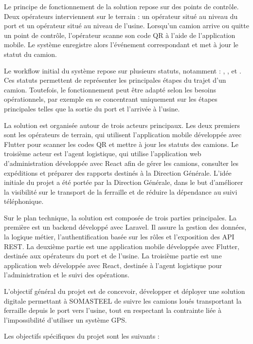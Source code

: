 Le principe de fonctionnement de la solution repose sur des points de contrôle. Deux opérateurs interviennent sur le terrain : un opérateur situé au niveau du port et un opérateur situé au niveau de l'usine. Lorsqu'un camion arrive ou quitte un point de contrôle, l'opérateur scanne son code QR à l'aide de l'application mobile. Le système enregistre alors l'événement correspondant et met à jour le statut du camion.

Le workflow initial du système repose sur plusieurs statuts, notamment : , ,  et . Ces statuts permettent de représenter les principales étapes du trajet d'un camion. Toutefois, le fonctionnement peut être adapté selon les besoins opérationnels, par exemple en se concentrant uniquement sur les étapes principales telles que la sortie du port et l'arrivée à l'usine.

La solution est organisée autour de trois acteurs principaux. Les deux premiers sont les opérateurs de terrain, qui utilisent l'application mobile développée avec Flutter pour scanner les codes QR et mettre à jour les statuts des camions. Le troisième acteur est l'agent logistique, qui utilise l'application web d'administration développée avec React afin de gérer les camions, consulter les expéditions et préparer des rapports destinés à la Direction Générale. L'idée initiale du projet a été portée par la Direction Générale, dans le but d'améliorer la visibilité sur le transport de la ferraille et de réduire la dépendance au suivi téléphonique.

Sur le plan technique, la solution est composée de trois parties principales. La première est un backend développé avec Laravel. Il assure la gestion des données, la logique métier, l'authentification basée sur les rôles et l'exposition des API REST. La deuxième partie est une application mobile développée avec Flutter, destinée aux opérateurs du port et de l'usine. La troisième partie est une application web développée avec React, destinée à l'agent logistique pour l'administration et le suivi des opérations.

L'objectif général du projet est de concevoir, développer et déployer une solution digitale permettant à SOMASTEEL de suivre les camions loués transportant la ferraille depuis le port vers l'usine, tout en respectant la contrainte liée à l'impossibilité d'utiliser un système GPS.

Les objectifs spécifiques du projet sont les suivants :

